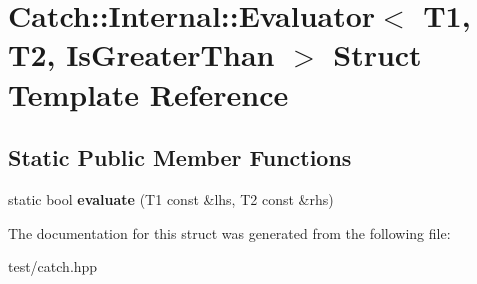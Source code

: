 \hypertarget{structCatch_1_1Internal_1_1Evaluator_3_01T1_00_01T2_00_01IsGreaterThan_01_4}{}\section{Catch\+:\+:Internal\+:\+:Evaluator$<$ T1, T2, Is\+Greater\+Than $>$ Struct Template Reference}
\label{structCatch_1_1Internal_1_1Evaluator_3_01T1_00_01T2_00_01IsGreaterThan_01_4}
\subsection*{Static Public Member Functions}
\begin{DoxyCompactItemize}
\item 
static bool {\bfseries evaluate} (T1 const \&lhs, T2 const \&rhs)\hypertarget{structCatch_1_1Internal_1_1Evaluator_3_01T1_00_01T2_00_01IsGreaterThan_01_4_a55745f74f09ac5c61bd3d592ca5560af}{}\label{structCatch_1_1Internal_1_1Evaluator_3_01T1_00_01T2_00_01IsGreaterThan_01_4_a55745f74f09ac5c61bd3d592ca5560af}

\end{DoxyCompactItemize}


The documentation for this struct was generated from the following file\+:\begin{DoxyCompactItemize}
\item 
test/catch.\+hpp\end{DoxyCompactItemize}
